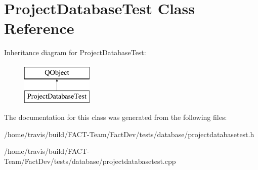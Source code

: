 \hypertarget{classProjectDatabaseTest}{\section{Project\-Database\-Test Class Reference}
\label{classProjectDatabaseTest}
}
Inheritance diagram for Project\-Database\-Test\-:\begin{figure}[H]
\begin{center}
\leavevmode
\includegraphics[height=2.000000cm]{df/d3e/classProjectDatabaseTest}
\end{center}
\end{figure}


The documentation for this class was generated from the following files\-:\begin{DoxyCompactItemize}
\item 
/home/travis/build/\-F\-A\-C\-T-\/\-Team/\-Fact\-Dev/tests/database/projectdatabasetest.\-h\item 
/home/travis/build/\-F\-A\-C\-T-\/\-Team/\-Fact\-Dev/tests/database/projectdatabasetest.\-cpp\end{DoxyCompactItemize}
